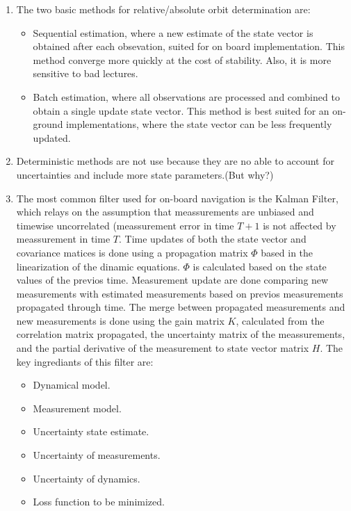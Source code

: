 \documentclass[a4paper]{article}
\begin{document}
\begin{enumerate}[label=\emph{\alph*)}]
  \item %
    The two basic methods for relative/absolute orbit determination are:
    \begin{itemize}
      \item Sequential estimation, where a new estimate of the state vector is obtained after each obsevation, suited for on board implementation. This method converge more quickly at the cost of stability. Also, it is more sensitive to bad lectures.
      \item Batch estimation, where all observations are processed and combined to obtain a single update state vector. This method is best suited for an on-ground implementations, where the state vector can be less frequently updated.
    \end{itemize}
  
  \item %
    Deterministic methods are not use because they are no able to account for uncertainties and include more state parameters.(But why?)

  \item The most common filter used for on-board navigation is the Kalman Filter, which relays on the assumption that meassurements are unbiased and timewise uncorrelated (meassurement error in time $T+1$ is not affected by meassurement in time $T$. Time updates of both the state vector and covariance matices is done using a propagation matrix $\Phi$ based in the linearization of the dinamic equations. $\Phi$ is calculated based on the state values of the previos time. Measurement update are done comparing new measurements with estimated measurements based on previos measurements propagated through time. The merge between propagated measurements and new measurements is done using the gain matrix $K$, calculated from the correlation matrix propagated, the uncertainty matrix of the meassurements, and the partial derivative of the measurement to state vector matrix $H$. The key ingrediants of this filter are:
    \begin{itemize}
      \item Dynamical model.
      \item Measurement model.
      \item Uncertainty state estimate.
      \item Uncertainty of measurements.
      \item Uncertainty of dynamics.
      \item Loss function to be minimized.
    \end{itemize}


\end{enumerate}
\end{document}
